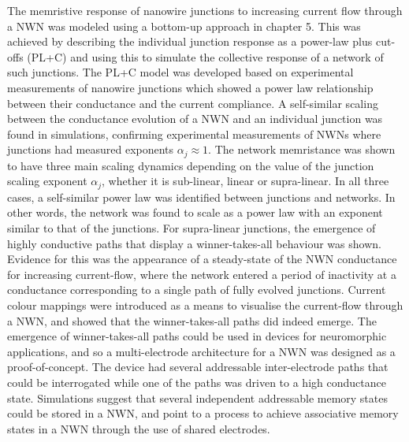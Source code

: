The memristive response of nanowire junctions to increasing current flow through a NWN was modeled using a bottom-up approach in chapter 5. This was achieved by describing the individual junction response as a power-law plus cut-offs (PL+C) and using this to simulate the collective response of a network of such junctions. The PL+C model was developed based on experimental measurements of nanowire junctions which showed a power law relationship between their conductance and the current compliance. A self-similar scaling between the conductance evolution of a NWN and an individual junction was found in simulations, confirming experimental measurements of NWNs where junctions had measured exponents $\alpha_j \approx 1$. The network memristance was shown to have three main scaling dynamics depending on the value of the junction scaling exponent $\alpha_j$, whether it is sub-linear, linear or supra-linear. In all three cases, a self-similar power law was identified between junctions and networks. In other words, the network was found to scale as a power law with an exponent similar to that of the junctions. For supra-linear junctions, the emergence of highly conductive paths that display a winner-takes-all behaviour was shown. Evidence for this was the appearance of a steady-state of the NWN conductance for increasing current-flow, where the network entered a period of inactivity at a conductance corresponding to a single path of fully evolved junctions. Current colour mappings were introduced as a means to visualise the current-flow through a NWN, and showed that the winner-takes-all paths did indeed emerge. The emergence of winner-takes-all paths could be used in devices for neuromorphic applications, and so a multi-electrode architecture for a NWN was designed as a proof-of-concept. The device had several addressable inter-electrode paths that could be interrogated while one of the paths was driven to a high conductance state. Simulations suggest that several independent addressable memory states could be stored in a NWN, and point to a process to achieve associative memory states in a NWN through the use of shared electrodes.


